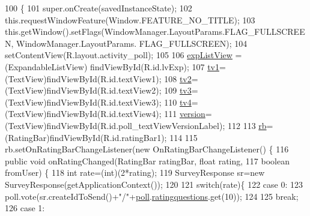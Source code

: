 \begin{DoxyCode}
100                                                        \{
101         super.onCreate(savedInstanceState);
102         this.requestWindowFeature(Window.FEATURE\_NO\_TITLE);
103         this.getWindow().setFlags(WindowManager.LayoutParams.FLAG\_FULLSCREEN, WindowManager.LayoutParams.
      FLAG\_FULLSCREEN);
104         setContentView(R.layout.activity\_poll);
105         
106         \hyperlink{classcom_1_1example_1_1qrpoll_1_1_poll_activity_a45d9887fce62772f80726024d1775f7d}{expListView} = (ExpandableListView) findViewById(R.id.lvExp);
107         \hyperlink{classcom_1_1example_1_1qrpoll_1_1_poll_activity_a7928323c2d0f40aa25420488718de309}{tv1}=(TextView)findViewById(R.id.textView1);
108         \hyperlink{classcom_1_1example_1_1qrpoll_1_1_poll_activity_a48f7da0dc1da430cd5ac90a8376cad70}{tv2}=(TextView)findViewById(R.id.textView2);
109         \hyperlink{classcom_1_1example_1_1qrpoll_1_1_poll_activity_a70708751ea7eb8a32569447a087471b8}{tv3}=(TextView)findViewById(R.id.textView3);
110         \hyperlink{classcom_1_1example_1_1qrpoll_1_1_poll_activity_a32c7797e7d6cdf269f9449cfdb635438}{tv4}=(TextView)findViewById(R.id.textView4);
111         \hyperlink{classcom_1_1example_1_1qrpoll_1_1_poll_activity_a4fbbfc95809c5aa0bf9916316730a992}{version}=(TextView)findViewById(R.id.poll\_textViewVersionLabel);
112         
113         \hyperlink{classcom_1_1example_1_1qrpoll_1_1_poll_activity_a3c2b3e0864209b0253263a7af2642a13}{rb}=(RatingBar)findViewById(R.id.ratingBar1);
114         
115         rb.setOnRatingBarChangeListener(\textcolor{keyword}{new} OnRatingBarChangeListener() \{
116             \textcolor{keyword}{public} \textcolor{keywordtype}{void} onRatingChanged(RatingBar ratingBar, \textcolor{keywordtype}{float} rating,
117                     \textcolor{keywordtype}{boolean} fromUser) \{
118                 \textcolor{keywordtype}{int} rate=(int)(2*rating);
119                 SurveyResponse sr=\textcolor{keyword}{new} SurveyResponse(getApplicationContext());
120             
121                 \textcolor{keywordflow}{switch}(rate)\{
122                 \textcolor{keywordflow}{case} 0:
123                     poll.vote(sr.createIdToSend()+\textcolor{stringliteral}{"/"}+\hyperlink{classcom_1_1example_1_1qrpoll_1_1_poll_activity_accbd807fe57852d64377c5a96401c376}{poll}.\hyperlink{classcom_1_1example_1_1qrpoll_1_1_poll_a357dc2acb9f42f2bee8dd88556551637}{ratingquestions}.get(10));
124                     
125                     \textcolor{keywordflow}{break};
126                 \textcolor{keywordflow}{case} 1:

\end{DoxyCode}
